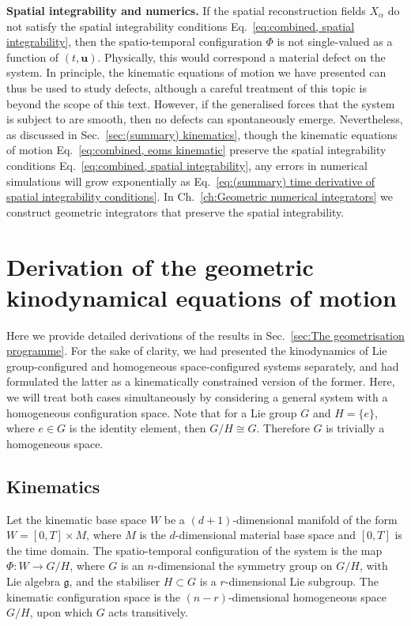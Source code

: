 \textbf{Spatial integrability and numerics.} If the spatial reconstruction fields $X_\alpha$ do not satisfy the spatial integrability conditions Eq.~\ref{eq:combined, spatial integrability}, then the spatio-temporal configuration $\Phi$ is not single-valued as a function of $(t, \mathbf{u})$. Physically, this would correspond a material defect on the system. In principle, the kinematic equations of motion we have presented can thus be used to study defects, although a careful treatment of this topic is beyond the scope of this text. However, if the generalised forces that the system is subject to are smooth, then no defects can spontaneously emerge. Nevertheless, as discussed in Sec.~\ref{sec:(summary) kinematics}, though the kinematic equations of motion Eq.~\ref{eq:combined, eoms kinematic} preserve the spatial integrability conditions Eq.~\ref{eq:combined, spatial integrability}, any errors in numerical simulations will grow exponentially as Eq.~\ref{eq:(summary) time derivative of spatial integrability conditions}. In Ch.~\ref{ch:Geometric numerical integrators} we construct geometric integrators that preserve the spatial integrability.

\section{Derivation of the geometric kinodynamical equations of motion}

Here we provide detailed derivations of the results in Sec.~\ref{sec:The geometrisation programme}. For the sake of clarity, we had presented the kinodynamics of Lie group-configured and homogeneous space-configured systems separately, and had formulated the latter as a kinematically constrained version of the former. Here, we will treat both cases simultaneously by considering a general system with a homogeneous configuration space. Note that for a Lie group $G$ and $H = \{e\}$, where $e \in G$ is the identity element, then $G/H \cong G$. Therefore $G$ is trivially a homogeneous space.

\subsection{Kinematics} \label{sec:Geometric kinematics}

Let the kinematic base space $W$ be a $(d+1)$-dimensional manifold of the form $W = [0, T] \times M$, where $M$ is the $d$-dimensional material base space and $[0, T]$ is the time domain. The spatio-temporal configuration of the system is the map $\Phi : W \to G/H$, where $G$ is an $n$-dimensional the symmetry group on $G/H$, with Lie algebra $\mathfrak{g}$, and the stabiliser $H \subset G$ is a $r$-dimensional Lie subgroup. The kinematic configuration space is the $(n-r)$-dimensional homogeneous space $G/H$, upon which $G$ acts transitively.

